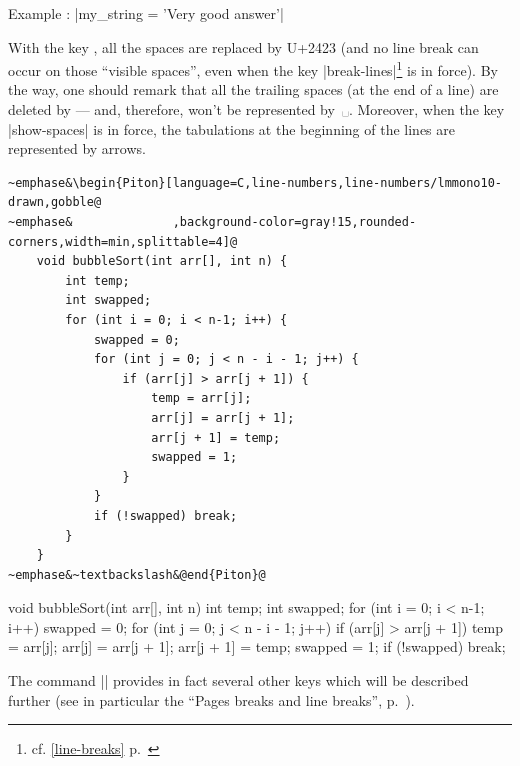 \documentclass{article}
\begin{document}
\begin{itemize}
\nobreak
\begingroup
{} Example : 
\piton|my_string = 'Very good answer'| \endgroup

With the key  , all the spaces are
replaced by U+2423 (and no line break can occur on those ``visible spaces'',
even when the key |break-lines|\footnote{cf. \ref{line-breaks}
p.~\pageref{line-breaks}} is in force). By the way, one should remark that all
the trailing spaces (at the end of a line) are deleted by  --- and,
therefore, won't be represented by~␣. Moreover, when the key |show-spaces| is
in force, the tabulations at the beginning of the lines are represented by arrows.
\end{itemize}

\bigskip
\begingroup
\small
{}
\begin{Verbatim}
~emphase&\begin{Piton}[language=C,line-numbers,line-numbers/lmmono10-drawn,gobble@
~emphase&              ,background-color=gray!15,rounded-corners,width=min,splittable=4]@
    void bubbleSort(int arr[], int n) {
        int temp;
        int swapped;
        for (int i = 0; i < n-1; i++) {
            swapped = 0;
            for (int j = 0; j < n - i - 1; j++) {
                if (arr[j] > arr[j + 1]) {
                    temp = arr[j];
                    arr[j] = arr[j + 1];
                    arr[j + 1] = temp;
                    swapped = 1; 
                }
            }
            if (!swapped) break;
        }
    }   
~emphase&~textbackslash&@end{Piton}@
\end{Verbatim}
\endgroup

\begingroup
{}
    \begin{Piton}
    void bubbleSort(int arr[], int n) {
        int temp;
        int swapped;
        for (int i = 0; i < n-1; i++) {
            swapped = 0;
            for (int j = 0; j < n - i - 1; j++) {
                if (arr[j] > arr[j + 1]) {
                    temp = arr[j];
                    arr[j] = arr[j + 1];
                    arr[j + 1] = temp;
                    swapped = 1; 
                }
            }
            if (!swapped) break;
        }
    }   
    \end{Piton}
\endgroup


\bigskip
The command |\PitonOptions| provides in fact several other keys which will be
described further (see in particular the ``Pages breaks and line breaks'',
p.~\pageref{breakable}). 
\end{document}

